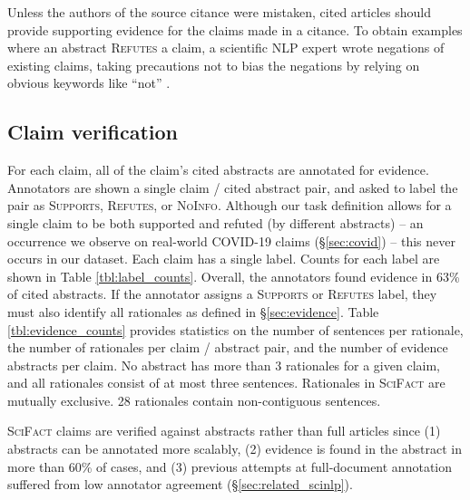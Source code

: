 \documentclass[11pt,a4paper]{article}
\newcommand{\ours}{\textsc{SciFact}\xspace}
\newcommand{\supports}{\textsc{Supports}\xspace}
\newcommand{\refutes}{\textsc{Refutes}\xspace}
\newcommand{\notenough}{\textsc{NoInfo}\xspace}
\begin{document}
\vspace{.2cm}  Unless the authors of the source citance were mistaken, cited articles should provide supporting evidence for the claims made in a citance. To obtain examples where an abstract \refutes a claim, a scientific NLP expert wrote negations of existing claims, taking precautions not to bias the negations by relying on obvious keywords like ``not'' \cite{Schuster2019TowardsDF}.




\subsection{Claim verification}
\label{sec:claim_verification}

 For each claim, all of the claim's cited abstracts are annotated for evidence. Annotators are shown a single claim / cited abstract pair, and asked to label the pair as \supports, \refutes, or \notenough. Although our task definition allows for a single claim to be both supported and refuted (by different abstracts) -- an occurrence we observe on real-world COVID-19 claims (\S\ref{sec:covid}) -- this never occurs in our dataset. Each claim has a single label. Counts for each label are shown in Table \ref{tbl:label_counts}. Overall, the annotators found evidence in 63\% of cited abstracts.  If the annotator assigns a \supports or \refutes label, they must also identify all rationales as defined in \S\ref{sec:evidence}. Table \ref{tbl:evidence_counts} provides statistics on the number of sentences per rationale, the number of rationales per claim / abstract pair, and the number of evidence abstracts per claim.  No abstract has more than 3 rationales for a given claim, and all rationales consist of at most three sentences. Rationales in \ours are mutually exclusive. 28 rationales contain non-contiguous sentences.

\ours claims are verified against abstracts rather than full articles since (1) abstracts can be annotated more scalably, (2) evidence is found in the abstract in more than 60\% of cases, and (3) previous attempts at full-document annotation suffered from low annotator agreement (\S\ref{sec:related_scinlp}).
\end{document}
